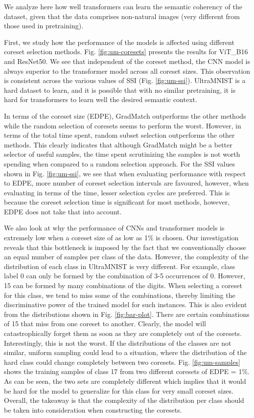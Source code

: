 We analyze here how well transformers can learn the semantic coherency of the dataset, given that the data comprises non-natural images (very different from those used in pretraining).


First, we study how the performance of the models is affected using different coreset selection methods. Fig. \ref{fig:um-coresets} presents the results for ViT\_B16 and ResNet50. We see that independent of the coreset method, the CNN model is always superior to the transformer model across all coreset sizes. This observation is consistent across the various values of SSI (Fig. \ref{fig:um-ssi}). UltraMNIST is a hard dataset to learn, and it is possible that with no similar pretraining, it is hard for transformers to learn well the desired semantic context.

In terms of the coreset size (EDPE), GradMatch outperforms the other methods while the random selection of coresets seems to perform the worst. However, in terms of the total time spent, random subset selection outperforms the other methods. This clearly indicates that although GradMatch might be a better selector of useful samples, the time spent scrutinizing the samples is not worth spending when compared to a random selection approach. For the SSI values shown in Fig. \ref{fig:um-ssi}, we see that when evaluating performance with respect to EDPE, more number of coreset selection intervals are favoured, however, when evaluating in terms of the time, lesser selection cycles are preferred. This is because the coreset selection time is significant for most methods, however, EDPE does not take that into account.

We also look at why the performance of CNNs and transformer models is extremely low when a coreset size of as low as 1\% is chosen. Our investigation reveals that this bottleneck is imposed by the fact that we conventionally choose an equal number of samples per class of the data. However, the complexity of the distribution of each class in UltraMNIST is very different. For example, class label 0 can only be formed by the combination of 3-5 occurrences of 0. However, 15 can be formed by many combinations of the digits. When selecting a coreset for this class, we tend to miss some of the combinations, thereby limiting the discriminative power of the trained model for such instances. This is also evident from the distributions shown in Fig. \ref{fig:bar-plot}. There are certain combinations of 15 that miss from one coreset to another. Clearly, the model will catastrophically forget them as soon as they are completely out of the coresets. Interestingly, this is not the worst. If the distributions of the classes are not similar, uniform sampling could lead to a situation, where the distribution of the hard class could change completely between two coresets. Fig. \ref{fig:um-samples} shows the training samples of class 17 from two different coresets of EDPE = 1\%. As can be seen, the two sets are completely different which implies that it would be hard for the model to generalize for this class for very small coreset sizes. Overall, the takeaway is that the complexity of the distribution per class should be taken into consideration when constructing the coresets.

